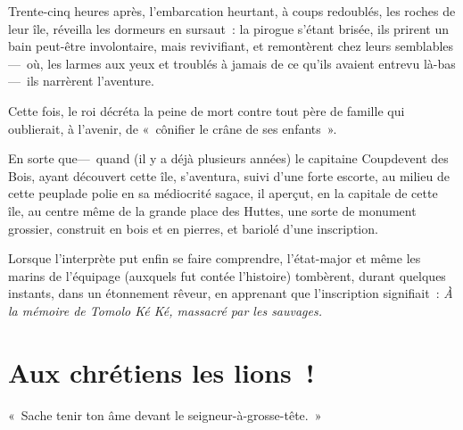 \documentclass[french,twoside]{book} %
\newcommand{\salute}[1]{\bigbreak{#1}\par\medbreak}
\begin{document}
Trente-cinq heures après, l’embarcation heurtant, à coups redoublés, les roches de leur île, réveilla les dormeurs en sursaut : la pirogue s’étant brisée, ils prirent un bain peut-être involontaire, mais revivifiant, et remontèrent chez leurs semblables— où, les larmes aux yeux et troublés à jamais de ce qu’ils avaient entrevu là-bas— ils narrèrent l’aventure.\par
   Cette fois, le roi décréta la peine de mort contre tout père de famille qui oublierait, à l’avenir, de « cônifier le crâne de ses enfants ».\par
En sorte que— quand (il y a déjà plusieurs années) le capitaine Coupdevent des Bois, ayant découvert cette île, s’aventura, suivi d’une forte escorte, au milieu de cette peuplade polie en sa médiocrité sagace, il aperçut, en la capitale de cette île, au centre même de la grande place des Huttes, une sorte de monument grossier, construit en bois et en pierres, et bariolé d’une inscription.\par
Lorsque l’interprète put enfin se faire comprendre, l’état-major et même les marins de l’équipage (auxquels fut contée l’histoire) tombèrent, durant quelques instants, dans un étonnement rêveur, en apprenant que l’inscription signifiait : \emph{À la mémoire de Tomolo Ké Ké, massacré par les sauvages.}
 \section[{Aux chrétiens les lions !}]{Aux chrétiens les lions !}\renewcommand{\leftmark}{Aux chrétiens les lions !}


\salute{À Monsieur Teodor de Wyzewa}
\noindent « Sache tenir ton âme devant le seigneur-à-grosse-tête. »\par
\end{document}
